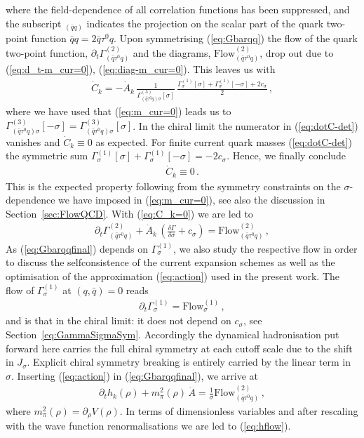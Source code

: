 \documentclass[%
reprint,
superscriptaddress,
showpacs,preprintnumbers,
 amsmath,amssymb,
 aps,
prd,
]{revtex4-1}
\def\eq#1{(\ref{#1})}
\def\sec#1{Section~\ref{#1}}
\begin{document}
%
where the field-dependence of all correlation functions has been
suppressed, and the subscript ${}_{(\bar q q)}$ indicates the
projection on the scalar part of the quark two-point function
$\bar q q = 2 \bar q \tau^0 q$. Upon symmetrising \eq{eq:Gbarqq} the
flow of the quark two-point function,
$\partial_t \Gamma_{(\bar q\tau^0 q)}^{(2)}$ and the diagrams,
$ \textrm{Flow}^{(2)}_{(\bar q\tau^0 q)}$, drop out due to
\eq{eq:d_t-m_cur=0}, \eq{eq:diag-m_cur=0}. This leaves us with
%
\begin{align}\label{eq:dotC-det}
  \dot{C}_k= - {\dot{A}_k}\, \frac{ 1}{
  \Gamma^{(3)}_{(\bar q \tau^0 q) \sigma}[\sigma]}\,\frac{
  \Gamma^{(1)}_\sigma[\sigma]+\Gamma^{(1)}_\sigma[
  -\sigma]+2 c_\sigma}{2} 
  \,, 
\end{align}
%
where we have used that \eq{eq:m_cur=0} leads us to
$ \Gamma^{(3)}_{(\bar q \tau^0 q) \sigma}[-\sigma]=
\Gamma^{(3)}_{(\bar q \tau^0 q) \sigma}[\sigma]$.  In the chiral limit
the numerator in \eq{eq:dotC-det} vanishes and $\dot{C}_k\equiv 0$ as
expected.  For finite current quark masses \eq{eq:dotC-det} the
symmetric sum
$ \Gamma^{(1)}_\sigma[\sigma]+\Gamma^{(1)}_\sigma[-\sigma] = - 2
c_\sigma$. Hence, we finally conclude
%
\begin{align}\label{eq:C_k=0}
\dot{C}_k\equiv 0\,. 
\end{align}
%
This is the expected property following from the symmetry constraints
on the $\sigma$-dependence we have imposed in \eq{eq:m_cur=0}, see
also the discussion in \sec{sec:FlowQCD}. With \eq{eq:C_k=0} we are
led to
%
\begin{align}
  \partial_t \Gamma_{(\bar q\tau^0 q)}^{(2)}+
  \dot{A}_k\, \left( \frac{\delta \Gamma}{\delta \sigma}
  +c_\sigma\right) =
  \textrm{Flow}^{(2)}_{(\bar q\tau^0 q)}
  \,,\label{eq:Gbarqqfinal}
\end{align}
As \eq{eq:Gbarqqfinal} depends on $\Gamma^{(1)}_\sigma$, we also study
the respective flow in order to discuss the selfconsistence of the
current expansion schemes as well as the optimisation of the
approximation \eq{eq:action} used in the present work. The flow of
$\Gamma^{(1)}_\sigma$ at $(q,\bar q)=0$ reads
%
\begin{align}
 \partial_t \Gamma_{\sigma}^{(1)}=
  \textrm{Flow}^{(1)}_{\sigma}
  \,,\label{eq:dotV-inserted}
\end{align}
%
and is that in the chiral limit: it does not depend on $c_\sigma$, see
\sec{eq:GammaSigmaSym}. Accordingly the dynamical hadronisation put
forward here carries the full chiral symmetry at each cutoff scale due
to the shift in $J_\sigma$. Explicit chiral symmetry breaking is
entirely carried by the linear term in $\sigma$.  Inserting
\eq{eq:action} in \eq{eq:Gbarqqfinal}, we arrive at
%
\begin{align}
  \partial_t h_k(\rho)  + 
  m_\pi^2(\rho) \,\dot{A}  = \frac1\sigma
  \textrm{Flow}^{(2)}_{(\bar q \tau^0 q)}\,,
  \label{eq:Gbarqqexplicitfinal}
\end{align}
%
where $m_\pi^2(\rho)=\partial_\rho V(\rho)$. In terms of dimensionless
variables and after rescaling with the wave function renormalisations
we are led to \eq{eq:hflow}.
\end{document}
